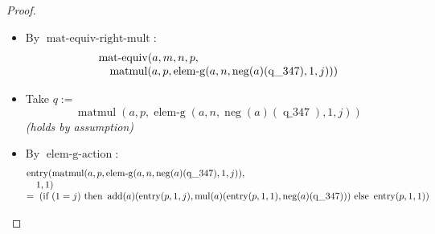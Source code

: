 \documentclass[11pt]{article}
\theoremstyle{plain}
\begin{document}
\begin{proof}
\begin{itemize}[leftmargin=2.8em, itemsep=4pt, parsep=1pt]
  \item[\textbf{22}] By $\operatorname{mat\text{-}equiv\text{-}right\text{-}mult}$:
\begin{equation*}
\begin{array}{@{}l@{}} \operatorname{mat\text{-}equiv}(a, m, n, p, \\ \quad \operatorname{matmul}(a, p, \operatorname{elem\text{-}g}(a, n, \operatorname{neg}(a)(\operatorname{q\_347}), 1, j))) \end{array}
\end{equation*}

  \item[\textbf{23--25}] Take $q :=$
\begin{equation*}
\operatorname{matmul}(a, p, \operatorname{elem\text{-}g}(a, n, \operatorname{neg}(a)(\operatorname{q\_347}), 1, j))
\end{equation*}
  \emph{(holds by assumption)}
  \item[\textbf{26--27}] By $\operatorname{elem\text{-}g\text{-}action}$:
\begin{equation*}
\begin{array}{@{}l@{}} \operatorname{entry}(\operatorname{matmul}(a, p, \operatorname{elem\text{-}g}(a, n, \operatorname{neg}(a)(\operatorname{q\_347}), 1, j)), \\ \quad 1, 1) \\ =\; \left(\text{if }(1 = j)\text{ then }\operatorname{add}(a)(\operatorname{entry}(p, 1, j), \operatorname{mul}(a)(\operatorname{entry}(p, 1, 1), \operatorname{neg}(a)(\operatorname{q\_347})))\text{ else }\operatorname{entry}(p, 1, 1)\right) \end{array}
\end{equation*}


\end{itemize}
\end{proof}
\end{document}
